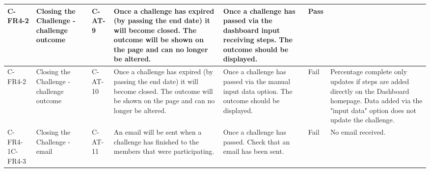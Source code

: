 \begin{longtable}{ |l|p{3cm}|l|p{5cm}|p{5cm}|l|p{6.5cm}|}
C-FR4-2        & Closing the Challenge - challenge outcome                   & C-AT-9  & Once a challenge has expired (by passing the end date) it will become closed. The outcome will be shown on the page and can no longer be altered.                                                                                                                                                                                                                                                                                                                                   & Once a challenge has passed via the dashboard input receiving steps. The outcome should be displayed.                                                                                                                    & Pass &                                                                                                                                                                                                                                                                  \\ \hline
C-FR4-2        & Closing the Challenge - challenge outcome                   & C-AT-10 & Once a challenge has expired (by passing the end date) it will become closed. The outcome will be shown on the page and can no longer be altered.                                                                                                                                                                                                                                                                                                                                   & Once a challenge has passed via the manual input data option. The outcome should be displayed.                                                                                                                           & Fail & Percentage complete only updates if steps are added directly on the Dashboard homepage.  Data added via the "input data" option does not update the challenge.                                                                                                  \\ \hline
C-FR4-1C-FR4-3 & Closing the Challenge - email                               & C-AT-11 & An email will be sent when a challenge has finished to the members that were participating.                                                                                                                                                                                                                                                                                                                                                                                         & Once a challenge has passed. Check that an email has been sent.                                                                                                                                                          & Fail & No email received.                                                                                                                                                                                                                                               \\ \hline

\end{longtable}
